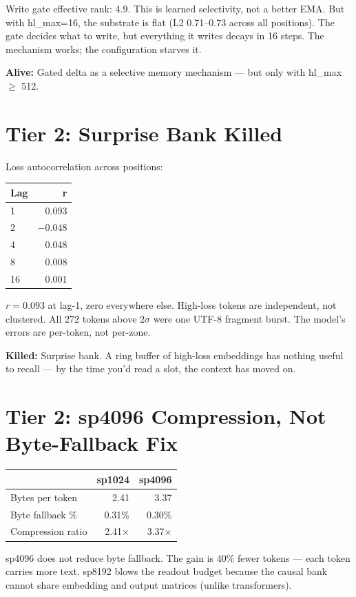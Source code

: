 \documentclass[11pt,a4paper]{report}
\newcommand{\killed}[1]{\textcolor{killed}{\textbf{Killed:}} #1}
\newcommand{\alive}[1]{\textcolor{alive}{\textbf{Alive:}} #1}
\begin{document}
Write gate effective rank: 4.9. This is learned selectivity, not a better EMA. But with hl\_max=16, the substrate is flat (L2 0.71--0.73 across all positions). The gate decides what to write, but everything it writes decays in 16 steps. The mechanism works; the configuration starves it.

\alive{Gated delta as a selective memory mechanism --- but only with hl\_max $\geq$ 512.}

\section{Tier 2: Surprise Bank Killed}

Loss autocorrelation across positions:

\begin{tabular}{lr}
\toprule
\textbf{Lag} & \textbf{r} \\
\midrule
1 & 0.093 \\
2 & $-0.048$ \\
4 & 0.048 \\
8 & 0.008 \\
16 & 0.001 \\
\bottomrule
\end{tabular}

$r = 0.093$ at lag-1, zero everywhere else. High-loss tokens are independent, not clustered. All 272 tokens above $2\sigma$ were one UTF-8 fragment burst. The model's errors are per-token, not per-zone.

\killed{Surprise bank. A ring buffer of high-loss embeddings has nothing useful to recall --- by the time you'd read a slot, the context has moved on.}

\section{Tier 2: sp4096 Compression, Not Byte-Fallback Fix}

\begin{tabular}{lrr}
\toprule
& \textbf{sp1024} & \textbf{sp4096} \\
\midrule
Bytes per token & 2.41 & 3.37 \\
Byte fallback \% & 0.31\% & 0.30\% \\
Compression ratio & 2.41$\times$ & 3.37$\times$ \\
\bottomrule
\end{tabular}

sp4096 does not reduce byte fallback. The gain is 40\% fewer tokens --- each token carries more text. sp8192 blows the readout budget because the causal bank cannot share embedding and output matrices (unlike transformers).
\end{document}

